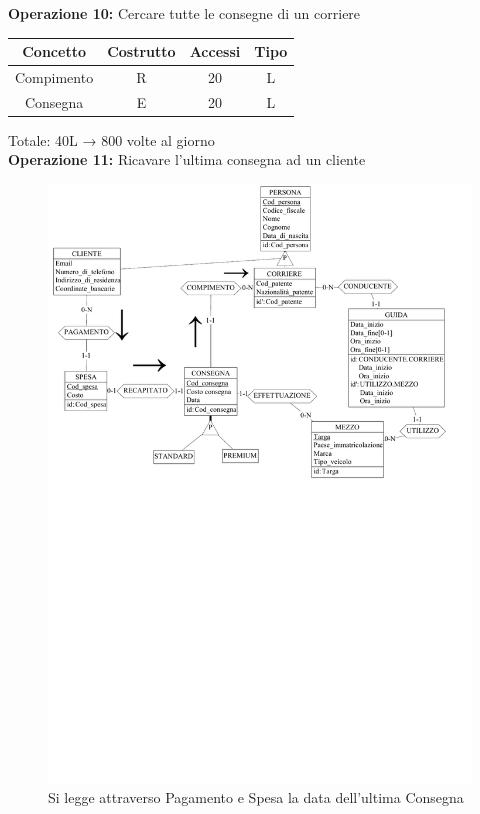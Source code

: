 \documentclass[a4paper,12pt]{report}
\begin{document}
\textbf{Operazione 10:}
Cercare tutte le consegne di un corriere\\
\begin{center}
    \begin{tabular}{ | c   c   c   c | } 
    \hline
	Concetto&Costrutto&Accessi&Tipo\\
	\hline
	Compimento&R&20&L\\
	\hline
    Consegna&E&20&L\\
	\hline
	\end{tabular}
\end{center}
Totale: 40L → 800 volte al giorno\\
\textbf{Operazione 11:}
Ricavare l'ultima consegna ad un cliente\\
\begin{figure}[H]
	\centering{}
	\includegraphics[width=\textwidth]{img/Operazione5.pdf}
	\caption{Si legge attraverso Pagamento e Spesa la data dell'ultima Consegna}
\end{figure}
\end{document}
